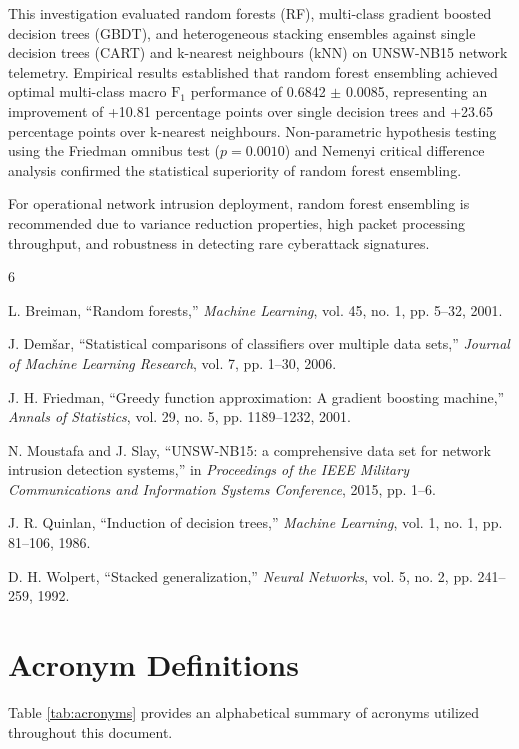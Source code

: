 \documentclass[10pt,conference,compsoc]{IEEEtran}
\begin{document}
This investigation evaluated random forests (RF), multi-class gradient boosted decision trees (GBDT), and heterogeneous stacking ensembles against single decision trees (CART) and k-nearest neighbours (kNN) on UNSW-NB15 network telemetry. Empirical results established that random forest ensembling achieved optimal multi-class macro $\text{F}_1$ performance of 0.6842 $\pm$ 0.0085, representing an improvement of +10.81 percentage points over single decision trees and +23.65 percentage points over k-nearest neighbours. Non-parametric hypothesis testing using the Friedman omnibus test ($p = 0.0010$) and Nemenyi critical difference analysis confirmed the statistical superiority of random forest ensembling.

For operational network intrusion deployment, random forest ensembling is recommended due to variance reduction properties, high packet processing throughput, and robustness in detecting rare cyberattack signatures.

\begin{thebibliography}{6}

L. Breiman, ``Random forests,'' \textit{Machine Learning}, vol. 45, no. 1, pp. 5--32, 2001.

J. Dem\v{s}ar, ``Statistical comparisons of classifiers over multiple data sets,'' \textit{Journal of Machine Learning Research}, vol. 7, pp. 1--30, 2006.

J. H. Friedman, ``Greedy function approximation: A gradient boosting machine,'' \textit{Annals of Statistics}, vol. 29, no. 5, pp. 1189--1232, 2001.

N. Moustafa and J. Slay, ``UNSW-NB15: a comprehensive data set for network intrusion detection systems,'' in \textit{Proceedings of the IEEE Military Communications and Information Systems Conference}, 2015, pp. 1--6.

J. R. Quinlan, ``Induction of decision trees,'' \textit{Machine Learning}, vol. 1, no. 1, pp. 81--106, 1986.

D. H. Wolpert, ``Stacked generalization,'' \textit{Neural Networks}, vol. 5, no. 2, pp. 241--259, 1992.

\end{thebibliography}

\appendices

\section{Acronym Definitions}
Table \ref{tab:acronyms} provides an alphabetical summary of acronyms utilized throughout this document.
\end{document}
